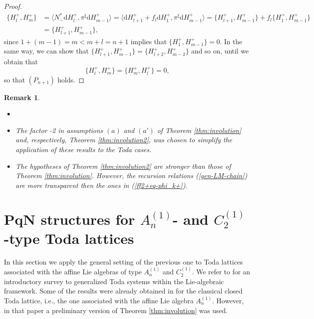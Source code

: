 \documentclass[12pt]{article}
\newtheorem{remark}[theorem]{Remark}
\newenvironment{rem}{\begin{remark} \rm}{\end{remark}}
\def\d{{\mathrm d}}
\def\parpo#1#2{\{#1,#2\}}
\begin{document}
\begin{proof}
\begin{equation*}
\begin{aligned}
 \parpo{H^+_l}{H^+_m}
 &=\langle N^*_-\d H^+_l,\pi^\sharp \d H^+_{m-1}\rangle
 =\langle \d H^+_{l+1}+f_l \d H^+_1,\pi^\sharp \d H^+_{m-1}\rangle
 =\parpo{H^+_{l+1}}{H^+_{m-1}}+f_l \parpo{H^+_1}{H^+_{m-1}}\\
 &=\parpo{H^+_{l+1}}{H^+_{m-1}},
\end{aligned}
\end{equation*}
since $1+(m-1)=m<m+l=n+1$ implies that $\parpo{H^+_1}{H^+_{m-1}}=0$. 
In the same way, we can show that $\parpo{H^+_{l+1}}{H^+_{m-1}}=\parpo{H^+_{l+2}}{H^+_{m-2}}$ and so on, until we obtain that 
\begin{equation*}
\label{recadd5+}
\parpo{H^+_l}{H^+_m}=\parpo{H^+_{m}}{H^+_{l}}=0,
\end{equation*}
so that $(P_{n+1})$ holds.
\end{proof}
\begin{rem}
\begin{itemize}
\item[]
\item The factor -2 in assumptions $(a)$ and $(a')$ of Theorem \ref{thm:involution} and, respectively, Theorem \ref{thm:involution2}, was chosen to simplify the application of these results to the Toda cases.
\item The hypotheses of Theorem \ref{thm:involution2} are stronger than those of Theorem \ref{thm:involution}. However, the 
recursion relations (\ref{gen-LM-chain}) are more transparent then the ones in (\ref{ff2+eq-phi_k+}).
\end{itemize}
\end{rem}


\section{PqN structures for $A^{(1)}_n$- and $C^{(1)}_2$-type Toda lattices}
\label{sec:Toda}

In this section we apply the general setting of the previous one to Toda lattices associated with the affine Lie algebras of type $A_{n}^{(1)}$ and $C_{2}^{(1)}$. We refer to \cite{RSTS} for an introductory survey to %
generalized Toda systems within the Lie-algebraic framework.
Some of the results were already obtained in \cite{FMOP2020} for the classical closed Toda lattice, i.e., the one 
associated with the affine Lie algebra $A_n^{(1)}$. However, in that paper a preliminary 
version of Theorem \ref{thm:involution} was used.
\end{document}
